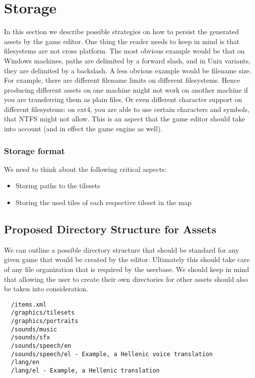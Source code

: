 \section{Storage}

In this section we describe possible strategies on how to persist the generated
assets by the game editor. One thing the reader needs to keep in mind is that
filesystems are not cross platform. The most obvious example would be that on
Windows machines, paths are delimited by a forward slash, and in Unix variants,
they are delimited by a backslash. A less obvious example would be filename
size. For example, there are different filename limits on different filesystems.
Hence producing different assets on one machine might not work on another
machine if you are transferring them as plain files. Or even different character
support on different filesystems: on ext4, you are able to use certain
characters and symbols, that NTFS might not allow. This is an aspect that the
game editor should take into account (and in effect the game engine as well).

\subsubsection{Storage format}

We need to think about the following critical aspects:

\begin{itemize}
\item Storing paths to the tilesets
\item Storing the used tiles of each respective tileset in the map
\end{itemize}

\subsection{Proposed Directory Structure for Assets}

We can outline a possible directory structure that should be standard for any
given game that would be created by the editor. Ultimately this should take
care of any file organization that is required by the userbase. We should keep
in mind that allowing the user to create their own directories for other assets
should also be taken into consideration.

\begin{lstlisting}
  /items.xml
  /graphics/tilesets
  /graphics/portraits
  /sounds/music
  /sounds/sfx
  /sounds/speech/en
  /sounds/speech/el - Example, a Hellenic voice translation
  /lang/en
  /lang/el - Example, a Hellenic translation
\end{lstlisting}

